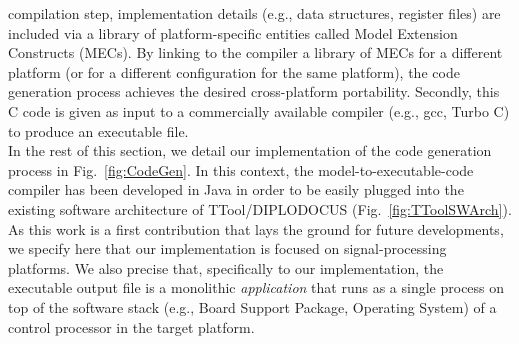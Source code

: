 \documentclass{llncs}
\begin{document}
compilation step, implementation details (e.g., data structures, register files) are included via a library of
platform-specific entities called Model Extension Constructs (MECs). By linking to the compiler a library of MECs for a
different platform (or for a different configuration for the same platform), the code generation process achieves the
desired cross-platform portability. Secondly, this C code is given as input to a commercially available compiler (e.g.,
gcc, Turbo C) to produce an executable file.\\
%
In the rest of this section, we detail our implementation of the code generation process in Fig.~\ref{fig:CodeGen}. In
this context, the model-to-executable-code compiler has been developed in Java in order to be
easily plugged into the existing software architecture of TTool/\-DI\-PLO\-DO\-CUS (Fig.~\ref{fig:TToolSWArch}). As this
work is a first contribution that lays the ground for future developments, we specify here that our implementation is
focused on signal-processing platforms. We also precise that, specifically to our implementation, the executable output
file is a monolithic \textit{application} that runs as a single process on top of the software stack (e.g., Board
Support Package, Operating System) of a control processor in the target platform.
%
%
\end{document}
